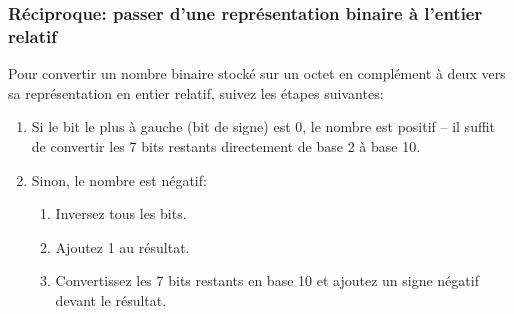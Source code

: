 \documentclass[12pt]{article}
\begin{document}
	\subsubsection*{Réciproque: passer d'une représentation binaire à l'entier relatif}
	
	Pour convertir un nombre binaire stocké sur un octet en complément à deux vers sa représentation en entier relatif, suivez les étapes suivantes:
	\begin{enumerate}
		\item Si le bit le plus à gauche (bit de signe) est 0, le nombre est positif -- il suffit de  convertir les 7 bits restants directement de base 2 à base 10.
		\item Sinon, le nombre est négatif:
		\begin{enumerate}
			\item Inversez tous les bits.
			\item Ajoutez 1 au résultat.
			\item Convertissez les 7 bits restants en base 10 et ajoutez un signe négatif devant le résultat.
		\end{enumerate}
	\end{enumerate}
	
\end{document}
